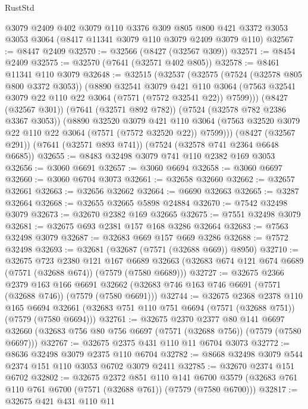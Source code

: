 \begin{lexlean}{RustStd}
\begin{coremodule}
    @3079
    @2409
    @402
    @3079
    @110
    @3376
    @309
    @805
    @800
    @421
    @3372
    @3053
    @3053
    @3064
    (@8417 @11341 @3079 @110 @3079 @2409 @3079 @110)
@32567 := @8447 @2409
@32570 := @32566 (@8427 (@32567 @309))
@32571 := @8454 @2409
@32575 := @32570 (@7641 (@32571 @402 @805))
@32578 := @8461 @11341 @110 @3079
@32648 := @32515
    (@32537
      (@32575
        (@7524 (@32578 @805 @800 @3372 @3053))
        (@8890
          @32541
          @3079
          @421
          @110
          @3064
          (@7563 @32541 @3079 @22 @110 @22 @3064 (@7571 (@7572 @32541 @22)) @7599)))
      (@8427 (@32567 @301))
      (@7641 (@32571 @892 @782))
      (@7524 (@32578 @782 @2386 @3367 @3053))
      (@8890
        @32520
        @3079
        @421
        @110
        @3064
        (@7563 @32520 @3079 @22 @110 @22 @3064 (@7571 (@7572 @32520 @22)) @7599)))
    (@8427 (@32567 @291))
    (@7641 (@32571 @893 @741))
    (@7524 (@32578 @741 @2364 @6648 @6685))
@32655 := @8483 @32498 @3079 @741 @110 @2382 @169 @3053
@32656 := @3060 @6691
@32657 := @3060 @6694
@32658 := @3060 @6697
@32660 := @3060 @6704 @3073
@32661 := @32658 @32660
@32662 := @32657 @32661
@32663 := @32656 @32662
@32664 := @6690 @32663
@32665 := @3287 @32664
@32668 := @32655 @32665 @5898 @24884
@32670 := @7542 @32498 @3079
@32673 := @32670 @2382 @169 @32665
@32675 := @7551 @32498 @3079
@32681 := @32675 @693 @2381 @157 @168 @3286 @32664
@32683 := @7563 @32498 @3079
@32687 := @32683 @669 @157 @669 @3286
@32688 := @7572 @32498
@32693 := @32681 (@32687 (@7571 (@32688 @669)) @8950)
@32710 := @32675
    @723
    @2380
    @121
    @167
    @6689
    @32663
    (@32683 @674 @121 @674 @6689 (@7571 (@32688 @674)) (@7579 (@7580 @6689)))
@32727 := @32675
    @2366
    @2379
    @163
    @166
    @6691
    @32662
    (@32683 @746 @163 @746 @6691 (@7571 (@32688 @746)) (@7579 (@7580 @6691)))
@32744 := @32675
    @2368
    @2378
    @110
    @165
    @6694
    @32661
    (@32683 @751 @110 @751 @6694 (@7571 (@32688 @751)) (@7579 (@7580 @6694)))
@32761 := @32675
    @2370
    @2377
    @80
    @141
    @6697
    @32660
    (@32683 @756 @80 @756 @6697 (@7571 (@32688 @756)) (@7579 (@7580 @6697)))
@32767 := @32675 @2375 @431 @110 @11 @6704 @3073
@32772 := @8636 @32498 @3079 @2375 @110 @6704
@32782 := @8668 @32498 @3079 @544 @2374 @151 @110 @3053 @6702 @3079 @2411
@32785 := @32670 @2374 @151 @6702
@32802 := @32675
    @2372
    @851
    @110
    @141
    @6700
    @3579
    (@32683 @761 @110 @761 @6700 (@7571 (@32688 @761)) (@7579 (@7580 @6700)))
@32817 := @32675
    @421
    @431
    @110
    @11

\end{coremodule}
\end{lexlean}
